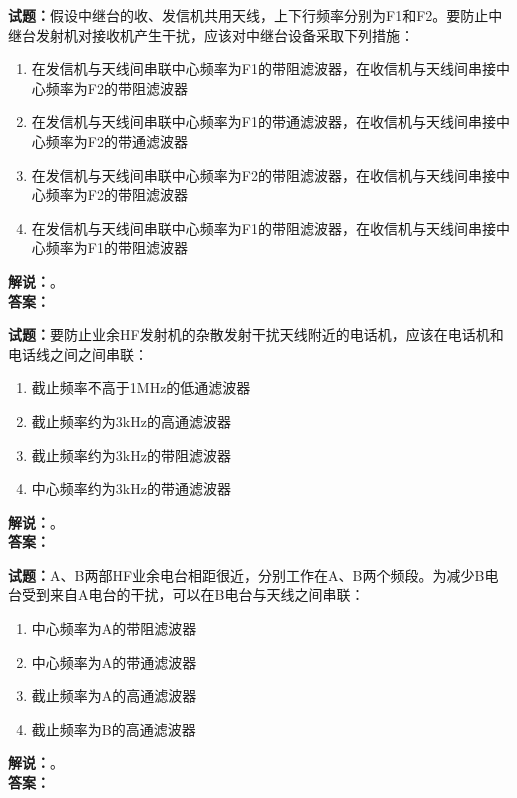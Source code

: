 \documentclass{ctexbook}
\begin{document}
\bigskip




\noindent\textbf{试题：}假设中继台的收、发信机共用天线，上下行频率分别为F1和F2。要防止中继台发射机对接收机产生干扰，应该对中继台设备采取下列措施：
\begin{enumerate}[leftmargin=3em]
\item 在发信机与天线间串联中心频率为F1的带阻滤波器，在收信机与天线间串接中心频率为F2的带阻滤波器
\item 在发信机与天线间串联中心频率为F1的带通滤波器，在收信机与天线间串接中心频率为F2的带通滤波器
\item 在发信机与天线间串联中心频率为F2的带阻滤波器，在收信机与天线间串接中心频率为F2的带阻滤波器
\item 在发信机与天线间串联中心频率为F1的带阻滤波器，在收信机与天线间串接中心频率为F1的带阻滤波器
\end{enumerate}
\noindent\textbf{解说：}\textbf{}。\\\noindent\textbf{答案：}

\bigskip




\noindent\textbf{试题：}要防止业余HF发射机的杂散发射干扰天线附近的电话机，应该在电话机和电话线之间之间串联：
\begin{enumerate}[leftmargin=3em]
\item 截止频率不高于1\unit{\MHz}的低通滤波器
\item 截止频率约为3\unit{\kHz}的高通滤波器
\item 截止频率约为3\unit{\kHz}的带阻滤波器
\item 中心频率约为3\unit{\kHz}的带通滤波器
\end{enumerate}
\noindent\textbf{解说：}\textbf{}。\\\noindent\textbf{答案：}

\bigskip




\noindent\textbf{试题：}A、B两部HF业余电台相距很近，分别工作在A、B两个频段。为减少B电台受到来自A电台的干扰，可以在B电台与天线之间串联：
\begin{enumerate}[leftmargin=3em]
\item 中心频率为A的带阻滤波器
\item 中心频率为A的带通滤波器
\item 截止频率为A的高通滤波器
\item 截止频率为B的高通滤波器
\end{enumerate}
\noindent\textbf{解说：}\textbf{}。\\\noindent\textbf{答案：}
\end{document}
